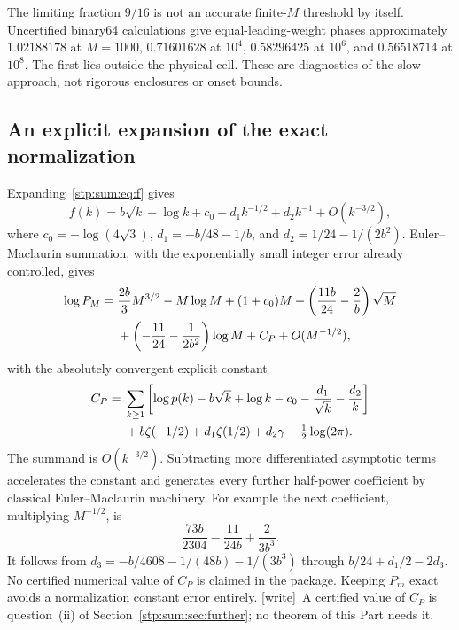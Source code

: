 \documentclass[11pt]{article}
\theoremstyle{remark}\newtheorem{remark}[theorem]{Remark}
\newcommand{\wtag}{\textup{[write]}}
\begin{document}
The limiting fraction $9/16$ is not an accurate finite-$M$ threshold by itself. Uncertified binary64 calculations give equal-leading-weight phases approximately $1.02188178$ at $M=1000$, $0.71601628$ at $10^4$, $0.58296425$ at $10^6$, and $0.56518714$ at $10^8$. The first lies outside the physical cell. These are diagnostics of the slow approach, not rigorous enclosures or onset bounds.

\subsection{An explicit expansion of the exact normalization}
Expanding~\eqref{stp:sum:eq:f} gives
\[
 f(k)=b\sqrt k-\log k+c_0+d_1k^{-1/2}+d_2k^{-1}+O(k^{-3/2}),
\]
where $c_0=-\log(4\sqrt3)$, $d_1=-b/48-1/b$, and $d_2=1/24-1/(2b^2)$. Euler--Maclaurin summation, with the exponentially small integer error already controlled, gives
\begin{align}
 \log P_M={}&\frac{2b}3M^{3/2}-M\log M+(1+c_0)M
  +\left(\frac{11b}{24}-\frac2b\right)\sqrt M\notag\\
 &+\left(-\frac{11}{24}-\frac1{2b^2}\right)\log M+C_P+O(M^{-1/2}),
 \label{stp:sum:eq:logP}
\end{align}
with the absolutely convergent explicit constant
\begin{align}
 C_P={}&\sum_{k\ge1}\left[\log p(k)-b\sqrt k+\log k-c_0
                         -\frac{d_1}{\sqrt k}-\frac{d_2}{k}\right]\notag\\
 &+b\zeta(-1/2)+d_1\zeta(1/2)+d_2\gamma-\tfrac12\log(2\pi).
 \label{stp:sum:eq:CP}
\end{align}
The summand is $O(k^{-3/2})$. Subtracting more differentiated asymptotic terms accelerates the constant and generates every further half-power coefficient by classical Euler--Maclaurin machinery. For example the next coefficient, multiplying $M^{-1/2}$, is
\[
 \frac{73b}{2304}-\frac{11}{24b}+\frac{2}{3b^3}.
\]
It follows from $d_3=-b/4608-1/(48b)-1/(3b^3)$ through $b/24+d_1/2-2d_3$. No certified numerical value of $C_P$ is claimed in the package. Keeping $P_m$ exact avoids a normalization constant error entirely. \wtag\ A certified value of $C_P$ is question~(ii) of
Section~\ref{stp:sum:sec:further}; no theorem of this Part needs it.
\end{document}
